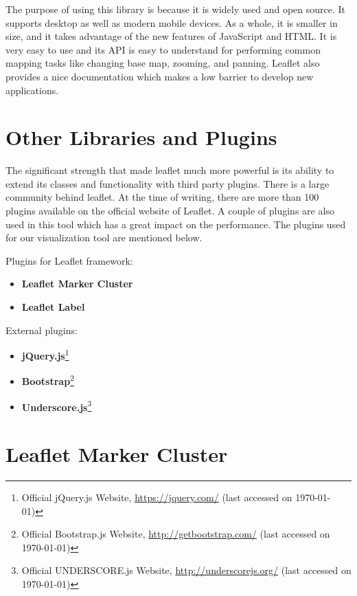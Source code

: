 The purpose of using this library is because it is widely used and open source. It supports desktop as well as modern mobile devices. As a whole, it is smaller in size, and it takes advantage of the new features of JavaScript and HTML. It is very easy to use and its API is easy to understand for performing common mapping tasks like changing base map, zooming, and panning. Leaflet also provides a nice documentation which makes a low barrier to develop new applications.

\section{Other Libraries and Plugins}
\label{olandp}

The significant strength that made leaflet much more powerful is its ability to extend its classes and functionality with third party plugins. There is a large community behind leaflet. At the time of writing, there are more than 100 plugins available on the official website of Leaflet. A couple of plugins are also used in this tool which has a great impact on the performance. The plugins used for our visualization tool are mentioned below.

Plugins for Leaflet framework:
\begin{itemize}
  \item \textbf{Leaflet Marker Cluster}
  \item \textbf{Leaflet Label}
\end{itemize}
External plugins:
\begin{itemize}
  \item \textbf{jQuery.js}\footnote{Official jQuery.js Website, \url{https://jquery.com/} (last accessed on \today)}
  \item \textbf{Bootstrap}\footnote{Official Bootstrap.js Website, \url{http://getbootstrap.com/}   (last accessed on \today)}
  \item \textbf{Underscore.js}\footnote{Official UNDERSCORE.js Website, \url{http://underscorejs.org/}  (last accessed on \today)}
\end{itemize}

\section*{Leaflet Marker Cluster}
\label{sec:clusterr}

